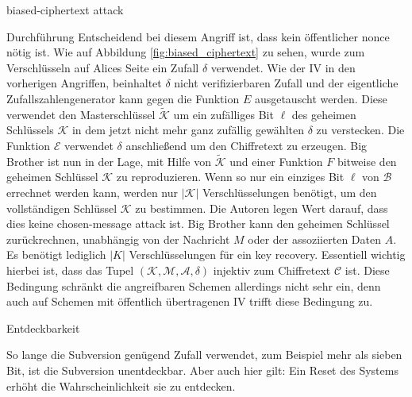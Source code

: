 \begin{section}{biased-ciphertext attack}
\begin{subsection}{Durchführung}
Entscheidend bei diesem Angriff ist, dass kein öffentlicher nonce nötig ist. Wie auf Abbildung \ref{fig:biased_ciphertext} zu sehen, wurde zum Verschlüsseln auf Alices Seite ein Zufall $\delta$ verwendet. Wie der IV in den vorherigen Angriffen, beinhaltet $\delta$ nicht verifizierbaren Zufall und der eigentliche Zufallszahlengenerator kann gegen die Funktion $E$ ausgetauscht werden. Diese verwendet den Masterschlüssel $\widetilde{\mathcal{K}}$ um ein zufälliges Bit $\ell$ des geheimen Schlüssels $\mathcal{K}$ in dem jetzt nicht mehr ganz zufällig gewählten $\delta$ zu verstecken. Die Funktion $\mathcal{E}$ verwendet $\delta$ anschließend um den Chiffretext zu erzeugen. Big Brother ist nun in der Lage, mit Hilfe von $\widetilde{\mathcal{K}}$ und einer Funktion $F$ bitweise den geheimen Schlüssel $\mathcal{K}$ zu reproduzieren. Wenn so nur ein einziges Bit $\ell$ von $\mathscr{B}$ errechnet werden kann, werden nur $|\mathcal{K}|$ Verschlüsselungen benötigt, um den vollständigen Schlüssel $\mathcal{K}$ zu bestimmen. Die Autoren legen Wert darauf, dass dies keine chosen-message attack ist. Big Brother kann den geheimen Schlüssel zurückrechnen, unabhängig von der Nachricht $M$ oder der assoziierten Daten $A$. Es benötigt lediglich $|K|$ Verschlüsselungen für ein key recovery. Essentiell wichtig hierbei ist, dass das Tupel $(\mathcal{K}, \mathcal{M}, \mathcal{A}, \delta)$ injektiv zum Chiffretext $\mathcal{C}$ ist. Diese Bedingung schränkt die angreifbaren Schemen allerdings nicht sehr ein, denn auch auf Schemen mit öffentlich übertragenen IV trifft diese Bedingung zu.

\end{subsection}

\begin{subsection}{Entdeckbarkeit}

So lange die Subversion genügend Zufall verwendet, zum Beispiel mehr als sieben Bit, ist die Subversion unentdeckbar. Aber auch hier gilt: Ein Reset des Systems erhöht die Wahrscheinlichkeit sie zu entdecken.

\end{subsection}

\end{section}
